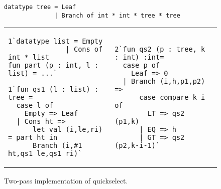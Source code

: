 
\begin{figure}[t]
\begin{lstlisting}
datatype tree = Leaf
              | Branch of int * int * tree * tree

\end{lstlisting}
\begin{tabular}{l|l}
\begin{lstlisting}
1`datatype list = Empty 
              | Cons of int * list
fun part (p : int, l : list) = ...`

1`fun qs1 (l : list) : tree =
  case l of
    Empty => Leaf
  | Cons ht => 
      let val (i,le,ri) = part ht in 
      Branch (i,#1 ht,qs1 le,qs1 ri)`

\end{lstlisting}
\hspace{1ex}
&
\hspace{1ex}
\begin{lstlisting}
2`fun qs2 (p : tree, k : int) :int= 
  case p of
    Leaf => 0
  | Branch (i,h,p1,p2) => 
      case compare k i of
        LT => qs2 (p1,k)
      | EQ => h
      | GT => qs2 (p2,k-i-1)`
\end{lstlisting}
\end{tabular}
\caption{Two-pass implementation of quickselect.}
\label{fig:qs-split}
\end{figure}

